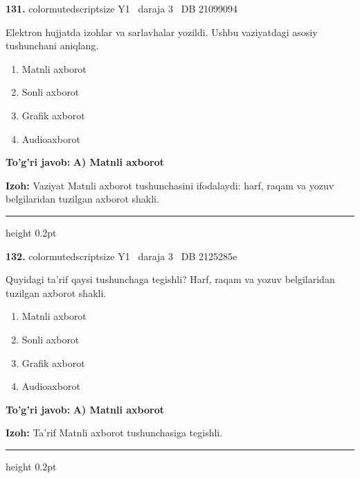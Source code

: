 \documentclass[10pt,a4paper,oneside]{article}
\begin{document}
\noindent\textbf{\color{ink}131.}  {color{muted}scriptsize Y1 \textbullet\ daraja 3 \textbullet\ DB 21099094}
\par
Elektron hujjatda izohlar va sarlavhalar yozildi. Ushbu vaziyatdagi asosiy tushunchani aniqlang.
\begin{enumerate}[label=\Alph*),leftmargin=9mm]
\item Matnli axborot
\item Sonli axborot
\item Grafik axborot
\item Audioaxborot
\end{enumerate}
\begin{tcolorbox}[enhanced,breakable,colback=teal!4,colframe=teal!50!black,boxrule=0.5pt,arc=1.1mm,left=3mm,right=3mm,top=1.7mm,bottom=1.7mm,before skip=2mm,after skip=2mm]
\textbf{\color{teal}To'g'ri javob:} \textbf{A) Matnli axborot}
\par\smallskip
\textbf{Izoh:} Vaziyat Matnli axborot tushunchasini ifodalaydi: harf, raqam va yozuv belgilaridan tuzilgan axborot shakli.
\end{tcolorbox}
\vspace{2mm}\hrule height 0.2pt \vspace{3mm}

\noindent\textbf{\color{ink}132.}  {color{muted}scriptsize Y1 \textbullet\ daraja 3 \textbullet\ DB 2125285e}
\par
Quyidagi ta'rif qaysi tushunchaga tegishli? Harf, raqam va yozuv belgilaridan tuzilgan axborot shakli.
\begin{enumerate}[label=\Alph*),leftmargin=9mm]
\item Matnli axborot
\item Sonli axborot
\item Grafik axborot
\item Audioaxborot
\end{enumerate}
\begin{tcolorbox}[enhanced,breakable,colback=teal!4,colframe=teal!50!black,boxrule=0.5pt,arc=1.1mm,left=3mm,right=3mm,top=1.7mm,bottom=1.7mm,before skip=2mm,after skip=2mm]
\textbf{\color{teal}To'g'ri javob:} \textbf{A) Matnli axborot}
\par\smallskip
\textbf{Izoh:} Ta'rif Matnli axborot tushunchasiga tegishli.
\end{tcolorbox}
\vspace{2mm}\hrule height 0.2pt \vspace{3mm}
\end{document}
